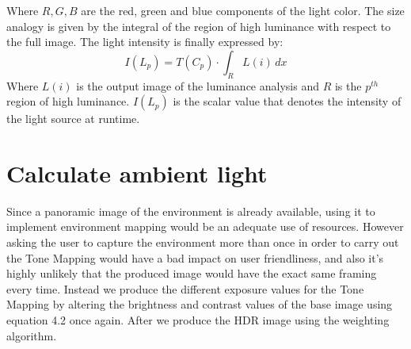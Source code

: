 \begin{enumerate}
Where $R, G, B$ are the red, green and blue components of the light color.\newline 
The size analogy is given by the integral of the region of high luminance with respect to the full image. The light intensity is finally expressed by:
\begin{equation}
I(L_p) = T(C_p) \cdot \int_R L(i) \,dx
\end{equation}
Where $L(i)$ is the output image of the luminance analysis and $R$ is the $p^{th}$ region of high luminance. $I(L_p)$ is the scalar value that denotes the intensity of the light source at runtime.\newline 

\end{enumerate}

\section{Calculate ambient light}
Since a panoramic image of the environment is already available, using it to implement environment mapping would be an adequate use of resources. However asking the user to capture the environment more than once in order to carry out the Tone Mapping would have a bad impact on user friendliness, and also it's highly unlikely that the produced image would have the exact same framing every time. Instead we produce the different exposure values for the Tone Mapping by altering the brightness and contrast values of the base image using equation 4.2 once again. After we produce the HDR image using the \citet{Debevec} weighting algorithm.\newline

